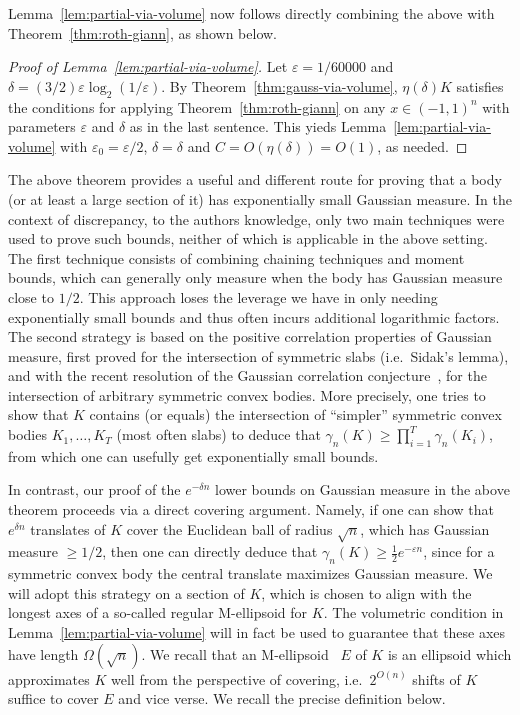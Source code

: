 \documentclass{article}
\newcommand\eps{\varepsilon}
\begin{document}
Lemma~\ref{lem:partial-via-volume} now follows directly combining the above with
Theorem~\ref{thm:roth-giann}, as shown below.

\begin{proof}[Proof of Lemma~\ref{lem:partial-via-volume}] 
Let $\eps = 1/60000$ and $\delta = (3/2) \eps \log_2(1/\eps)$. By
Theorem~\ref{thm:gauss-via-volume}, $\eta(\delta) K$ satisfies the conditions
for applying Theorem~\ref{thm:roth-giann} on any $x \in (-1,1)^n$ with
parameters $\eps$ and $\delta$ as in the last sentence. This yieds
Lemma~\ref{lem:partial-via-volume} with $\eps_0 = \eps/2$, $\delta = \delta$ and
$C = O(\eta(\delta)) = O(1)$, as needed.   
\end{proof}

The above theorem provides a useful and different route for proving that a body
(or at least a large section of it) has exponentially small Gaussian measure. In
the context of discrepancy, to the authors knowledge, only two main techniques
were used to prove such bounds, neither of which is applicable in the above
setting. The first technique consists of combining chaining techniques and
moment bounds, which can generally only measure when the body has Gaussian
measure close to $1/2$.  This approach loses the leverage we have in only
needing exponentially small bounds and thus often incurs additional
logarithmic factors. The second strategy is based on the positive correlation
properties of Gaussian measure, first proved for the intersection of symmetric
slabs (i.e.~Sidak's lemma), and with the recent resolution of the Gaussian
correlation conjecture~\cite{Royen14}, for the intersection of arbitrary
symmetric convex bodies. More precisely, one tries to show that $K$ contains (or
equals) the intersection of ``simpler'' symmetric convex bodies $K_1,\dots,K_T$
(most often slabs) to deduce that $\gamma_n(K) \geq \prod_{i=1}^T
\gamma_n(K_i)$, from which one can usefully get exponentially small bounds.

In contrast, our proof of the $e^{-\delta n}$ lower bounds on Gaussian measure
in the above theorem proceeds via a direct covering argument. Namely, if one can
show that $e^{\delta n}$ translates of $K$ cover the Euclidean ball of radius
$\sqrt{n}$, which has Gaussian measure $\geq 1/2$, then one can directly deduce
that $\gamma_n(K) \geq \frac{1}{2} e^{-\eps n}$, since for a symmetric convex
body the central translate maximizes Gaussian measure. We will adopt this
strategy on a section of $K$, which is chosen to align with the longest axes of a
so-called regular M-ellipsoid for $K$. The volumetric condition in
Lemma~\ref{lem:partial-via-volume} will in fact be used to guarantee that these
axes have length $\Omega(\sqrt{n})$. We recall that an
M-ellipsoid~\cite{Milman86-reverseBM} $E$ of $K$ is an ellipsoid which
approximates $K$ well from the perspective of covering, i.e.~$2^{O(n)}$ shifts
of $K$ suffice to cover $E$ and vice verse. We recall the precise
definition below. 
\end{document}
